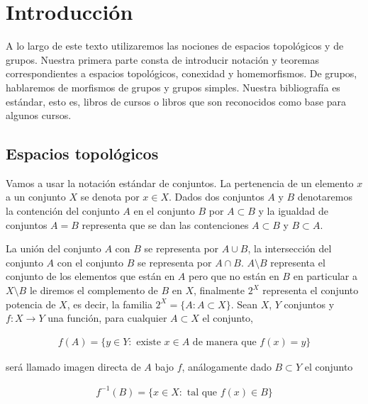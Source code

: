 

	


	
\chapter{Introducción}

A lo largo de este texto utilizaremos las nociones de espacios topológicos y de grupos. Nuestra primera parte consta de introducir notación y teoremas correspondientes a espacios topológicos, conexidad y homemorfismos. De grupos, hablaremos de morfismos de grupos y grupos simples. Nuestra bibliografía es estándar, esto es, libros de cursos o libros que son reconocidos como base para algunos cursos. 


\section*{Espacios topológicos}

 Vamos a usar la notación estándar de conjuntos. La pertenencia de un elemento $x$ a un conjunto $X$ se denota por $x \in X$. Dados dos conjuntos $A$ y $B$ denotaremos la contención del conjunto $A$ en el conjunto $B$ por $A \subset B$ y la igualdad de conjuntos $A=B$ representa que se dan las contenciones $A \subset B$ y $B \subset A$.

La unión del conjunto $A$ con $B$ se representa por $A \cup B$, la intersección del conjunto $A$ con el conjunto $B$ se representa por $A \cap B$. $A \setminus B$ representa el conjunto de los elementos que están en $A$ pero que no están en $B$ en particular a $X\setminus B$ le diremos el complemento de $B$ en $X$,  finalmente $2^X$ representa el conjunto potencia de $X$, es decir, la familia $2^X=\{A: A \subset X\}$.  Sean $X$, $Y$ conjuntos y $f:X \to Y$ una función, para cualquier $A \subset X$ el conjunto,
 
 \begin{align*}
 f(A)=\{y \in Y : \text{ existe }x \in A \text{ de manera que } f(x)=y\}
 \end{align*}

será llamado imagen directa de $A$ bajo $f$, análogamente dado $B \subset Y$ el conjunto 

\begin{align*}
f^{-1}(B)=\{x \in X :\text{ tal que } f(x) \in B \}
\end{align*}

